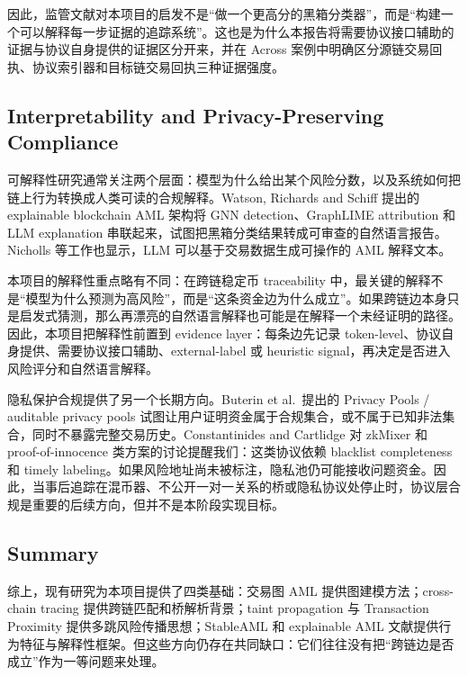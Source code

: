 \documentclass[12pt,a4paper]{ctexart}
\begin{document}
因此，监管文献对本项目的启发不是``做一个更高分的黑箱分类器''，而是``构建一个可以解释每一步证据的追踪系统''。这也是为什么本报告将需要协议接口辅助的证据与协议自身提供的证据区分开来，并在 Across
案例中明确区分源链交易回执、协议索引器和目标链交易回执三种证据强度。

\hypertarget{interpretability-and-privacy-preserving-compliance}{%
\subsection{Interpretability and Privacy-Preserving
Compliance}\label{interpretability-and-privacy-preserving-compliance}}

可解释性研究通常关注两个层面：模型为什么给出某个风险分数，以及系统如何把链上行为转换成人类可读的合规解释。Watson,
Richards and Schiff 提出的 explainable blockchain AML 架构将 GNN
detection、GraphLIME attribution 和 LLM explanation
串联起来，试图把黑箱分类结果转成可审查的自然语言报告。Nicholls
等工作也显示，LLM 可以基于交易数据生成可操作的 AML 解释文本。

本项目的解释性重点略有不同：在跨链稳定币 traceability
中，最关键的解释不是``模型为什么预测为高风险''，而是``这条资金边为什么成立''。如果跨链边本身只是启发式猜测，那么再漂亮的自然语言解释也可能是在解释一个未经证明的路径。因此，本项目把解释性前置到
evidence layer：每条边先记录
token-level、协议自身提供、需要协议接口辅助、external-label 或
heuristic signal，再决定是否进入风险评分和自然语言解释。

隐私保护合规提供了另一个长期方向。Buterin et al.~提出的 Privacy Pools /
auditable privacy pools
试图让用户证明资金属于合规集合，或不属于已知非法集合，同时不暴露完整交易历史。Constantinides
and Cartlidge 对 zkMixer 和 proof-of-innocence
类方案的讨论提醒我们：这类协议依赖 blacklist completeness 和 timely
labeling。如果风险地址尚未被标注，隐私池仍可能接收问题资金。因此，当事后追踪在混币器、不公开一对一关系的桥或隐私协议处停止时，协议层合规是重要的后续方向，但并不是本阶段实现目标。

\hypertarget{summary}{%
\subsection{Summary}\label{summary}}

综上，现有研究为本项目提供了四类基础：交易图 AML
提供图建模方法；cross-chain tracing 提供跨链匹配和桥解析背景；taint
propagation 与 Transaction Proximity 提供多跳风险传播思想；StableAML 和
explainable AML
文献提供行为特征与解释性框架。但这些方向仍存在共同缺口：它们往往没有把``跨链边是否成立''作为一等问题来处理。
\end{document}
